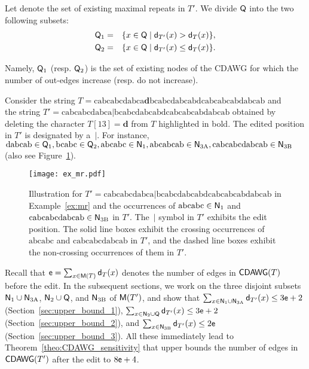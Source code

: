 \begin{definition} \label{def:existing_maximal_repeats}
  Let
  denote
  the set of existing maximal repeats in $T'$.
  We divide $\mathsf{Q}$ into the two following subsets:
  \begin{eqnarray*}
    \mathsf{Q}_{\mathrm{1}} & = & \{x \in \mathsf{Q} \mid \mathsf{d}_{T'}(x) > \mathsf{d}_T(x)\},\\
    \mathsf{Q}_{\mathrm{2}} & = & \{x \in \mathsf{Q} \mid \mathsf{d}_{T'}(x) \leq \mathsf{d}_T(x)\}.
  \end{eqnarray*}
\end{definition}
Namely, $\mathsf{Q}_{\mathrm{1}}$ (resp. $\mathsf{Q}_{\mathrm{2}}$) is the set of existing nodes of the CDAWG
for which the number of out-edges increase (resp. do not increase). 

\begin{example}
  \label{ex:mr}
  Consider the string $T = \mathrm{cabcabcdabca}\mathbf{d}\mathrm{bcabcdabcabdcabcabcabdabcab}$
  and \\
  the string $T' = \mathrm{cabcabcdabca|bcabcdabcabdcabcabcabdabcab}$ obtained by deleting the character $T[13] = \mathbf{d}$ from $T$ highlighted in bold.
  The edited position in $T'$ is designated by a~$|$.
  For instance, 
  $\mathrm{dabcab}\in\mathsf{Q}_{\mathrm{1}}, \mathrm{bcabc}\in\mathsf{Q}_{\mathrm{2}}, \mathrm{abcabc}\in\mathsf{N}_{\mathrm{1}}, \mathrm{abcabcab}\in\mathsf{N}_{\mathrm{3A}}, \mathrm{cabcabcdabcab}\in\mathsf{N}_{\mathrm{3B}}$
  (also see Figure~\ref{fig:ex_mr}).
\end{example}

\begin{figure}[H]
  \centering
  \texttt{[image: ex\_mr.pdf]}
  \caption{Illustration for $T'= \mathrm{cabcabcdabca|bcabcdabcabdcabcabcabdabcab}$ in Example~\ref{ex:mr} and the occurrences of $\mathrm{abcabc}\in\mathsf{N}_{\mathrm{1}}$ and $\mathrm{cabcabcdabcab}\in\mathsf{N}_{\mathrm{3B}}$ in $T'$.
  The~$|$ symbol in $T'$ exhibits the edit position. The solid line boxes exhibit the crossing occurrences of $\mathrm{abcabc}$ and $\mathrm{cabcabcdabcab}$ in $T'$,
  and the dashed line boxes exhibit the non-crossing occurrences of them in $T'$.}
  \label{fig:ex_mr}
\end{figure}

Recall that $\mathsf{e} = \sum_{x \in \mathsf{M}(T)}\mathsf{d}_T(x)$ denotes the number of edges
in $\mathsf{CDAWG}(T)$ before the edit.
In the subsequent sections,
we work on the three disjoint subsets
$\mathsf{N}_{\mathrm{1}} \cup \mathsf{N}_{\mathrm{3A}}$, 
$\mathsf{N}_{\mathrm{2}} \cup \mathsf{Q}$, and
$\mathsf{N}_{\mathrm{3B}}$ of $\mathsf{M}(T')$,
and show that $\sum_{x \in \mathsf{N}_{\mathrm{1}} \cup \mathsf{N}_{\mathrm{3A}}}\mathsf{d}_{T'}(x) \le 3\mathsf{e}+2$ (Section~\ref{sec:upper_bound_1}),
$\sum_{x \in \mathsf{N}_{\mathrm{2}} \cup \mathsf{Q}}\mathsf{d}_{T'}(x) \le 3\mathsf{e}+2$ (Section~\ref{sec:upper_bound_2}),
and $\sum_{x \in \mathsf{N}_{\mathrm{3B}}}\mathsf{d}_{T'}(x) \le 2\mathsf{e}$ (Section~\ref{sec:upper_bound_3}).
All these immediately lead to Theorem~\ref{theo:CDAWG_sensitivity}
that upper bounds the number of edges in $\mathsf{CDAWG}(T')$ after the edit to $8\mathsf{e} + 4$.


